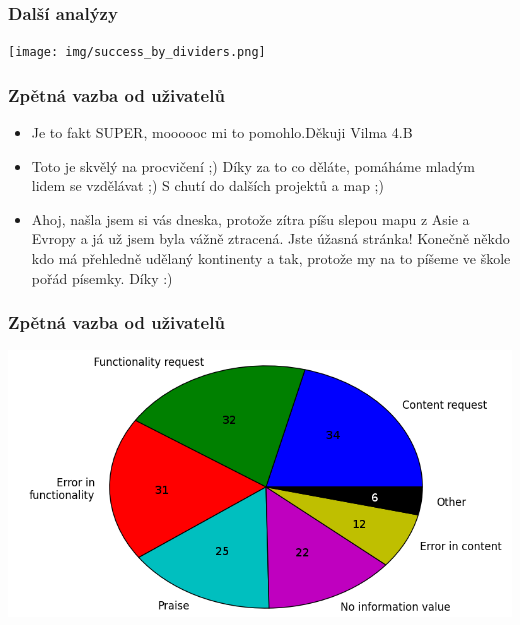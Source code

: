 \documentclass[xcolor=svgnames]{beamer}
\begin{document}
\begin{frame}
	\frametitle{Další analýzy}
   \texttt{[image: img/success\_by\_dividers.png]}
\end{frame}
\begin{frame}
	\frametitle{Zpětná vazba od uživatelů}
  \begin{itemize}
   \item Je to fakt SUPER, moooooc mi to pomohlo.Děkuji Vilma 4.B
   \item Toto je skvělý na procvičení ;) Díky za to co děláte, pomáháme mladým lidem se vzdělávat ;) S chutí do dalších projektů a map ;)
   \item Ahoj, našla jsem si vás dneska, protože zítra píšu slepou mapu z Asie a Evropy a já už jsem byla vážně ztracená. Jste úžasná stránka! Konečně někdo kdo má přehledně udělaný kontinenty a tak, protože my na to píšeme ve škole pořád písemky. Díky :)
  \end{itemize}
\end{frame}
\begin{frame}
	\frametitle{Zpětná vazba od uživatelů}
   \includegraphics[width=\textwidth]{img/feedback_by_type.png}
\end{frame}
\end{document}
